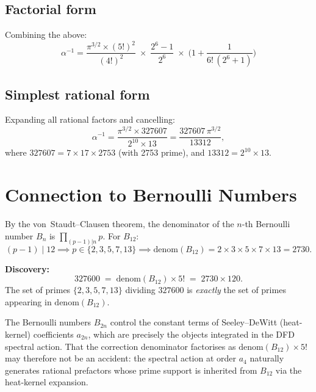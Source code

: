 \documentclass[11pt]{article}
\begin{document}
\subsection{Factorial form}

Combining the above:
\begin{equation}
\boxed{\;
\alpha^{-1}
= \frac{\pi^{3/2}\times(5!)^2}{(4!)^2}
\;\times\;\frac{2^6-1}{2^6}
\;\times\;\biggl(1 + \frac{1}{6!\,(2^6+1)}\biggr)
\;}
\label{eq:factorial}
\end{equation}

\subsection{Simplest rational form}

Expanding all rational factors and cancelling:
\begin{equation}
\alpha^{-1}
= \frac{\pi^{3/2}\times 327607}{2^{10}\times 13}
= \frac{327607\,\pi^{3/2}}{13312},
\label{eq:simplest}
\end{equation}
where $327607 = 7\times 17\times 2753$ (with 2753 prime),
and $13312 = 2^{10}\times 13$.

\section{Connection to Bernoulli Numbers}
\label{sec:bernoulli}

By the von~Staudt--Clausen theorem, the denominator of the $n$-th Bernoulli
number $B_n$ is $\prod_{(p-1)|n} p$.  For $B_{12}$:
\[
(p-1)\mid 12 \implies p\in\{2,3,5,7,13\}
\implies \mathrm{denom}(B_{12}) = 2\times 3\times 5\times 7\times 13 = 2730.
\]

\noindent
\textbf{Discovery:}
\begin{equation}
327600 \;=\; \mathrm{denom}(B_{12})\times 5! \;=\; 2730\times 120.
\label{eq:bernoulli}
\end{equation}
The set of primes $\{2,3,5,7,13\}$ dividing $327600$ is \emph{exactly}
the set of primes appearing in $\mathrm{denom}(B_{12})$.

The Bernoulli numbers $B_{2n}$ control the constant terms of Seeley--DeWitt
(heat-kernel) coefficients $a_{2n}$, which are precisely the objects integrated
in the DFD spectral action.  That the correction denominator factorises as
$\mathrm{denom}(B_{12})\times 5!$ may therefore not be an accident: the
spectral action at order $a_4$ naturally generates rational prefactors whose
prime support is inherited from $B_{12}$ via the heat-kernel expansion.
\end{document}
